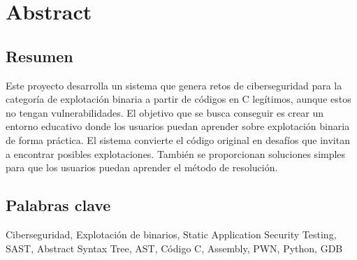 \chapter*{Abstract}
\section*{Resumen}
Este proyecto desarrolla un sistema que genera
retos de ciberseguridad para la categoría de explotación binaria a partir de códigos en C
legítimos, aunque estos no tengan vulnerabilidades.
El objetivo que se busca conseguir es crear un entorno educativo donde los usuarios puedan aprender sobre explotación binaria de forma práctica.
El sistema convierte el código original en desafíos que invitan a encontrar posibles explotaciones. También se proporcionan soluciones simples para que los usuarios puedan aprender el método de resolución.

\section*{Palabras clave}
Ciberseguridad, Explotación de binarios, Static Application Security Testing, SAST, Abstract Syntax Tree, AST, Código C, Assembly, PWN, Python, GDB
